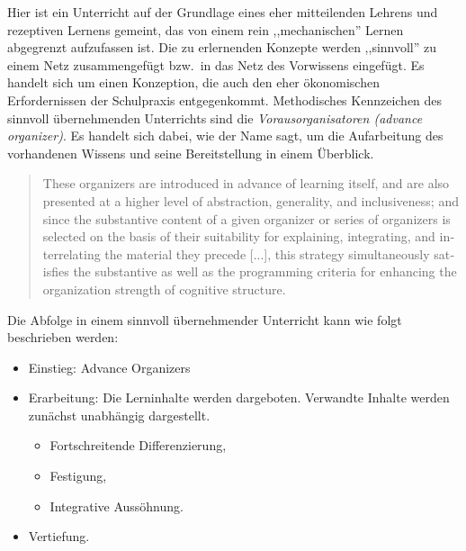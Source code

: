 Hier ist ein Unterricht auf der Grundlage eines
eher mitteilenden Lehrens und rezeptiven Lernens
gemeint, das von einem rein ,,mechanischen''
Lernen abgegrenzt aufzufassen ist.
Die zu erlernenden Konzepte werden ,,sinnvoll''
zu einem Netz zusammengef\"{u}gt bzw.\ in das Netz des Vorwissens
eingef\"{u}gt.
\bip
Es handelt sich um einen Konzeption, die auch den eher \"{o}konomischen
Erfordernissen der Schulpraxis entgegenkommt.
\bip
Methodisches Kennzeichen des sinnvoll \"{u}bernehmenden Unterrichts
sind die {\it Vorausorganisatoren (advance organizer)}.
Es handelt sich dabei, wie der Name sagt, um die Aufarbeitung
des vorhandenen Wissens und seine Bereitstellung in einem
\"{U}berblick.
\begin{quote}
	\foreignlanguage{english}{
These organizers are introduced in advance of
learning itself, and are also presented at a higher level
of abstraction, generality, and inclusiveness; and since
the substantive content of a given organizer or
series of organizers is selected on the basis of their
suitability for explaining, integrating, and interrelating the
material they precede [...], this strategy simultaneously satisfies the
substantive as well as the programming criteria for enhancing
the organization strength of cognitive structure.} \autocite[81]{Ausubel}
\end{quote}

Die Abfolge in einem sinnvoll \"{u}bernehmender Unterricht
kann wie folgt beschrieben werden:
\begin{itemize}
\item Einstieg: Advance Organizers
\item Erarbeitung: Die Lerninhalte werden dargeboten.
Verwandte Inhalte werden zun\"{a}chst unabh\"{a}ngig dargestellt.
\begin{itemize}
\item Fortschreitende Differenzierung,
\item Festigung,
\item Integrative Auss\"{o}hnung.
\end{itemize}
\item Vertiefung.
\end{itemize}



